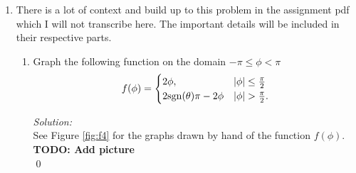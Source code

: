 \documentclass[10pt]{amsart}
\theoremstyle{nonumberplain}
\begin{document}
\begin{enumerate}[label={\bf {\arabic*}:}]
\begin{enumerate}
\end{enumerate}

\newpage

\item There is a lot of context and build up to this problem in the assignment pdf which I will not transcribe here.
The important details will be included in their respective parts. \\

\begin{enumerate}

\item Graph the following function on the domain $-\pi \leq \phi < \pi$
\begin{align*}
f(\phi) = \begin{cases}
2\phi, & |\phi| \leq \frac \pi 2 \\
2 {\rm sgn}(\theta)\pi - 2\phi & |\phi| > \frac \pi 2.
\end{cases}
\end{align*}

\textit{Solution:} \\
See Figure \ref{fig:f4} for the graphs drawn by hand of the function $f(\phi)$.
\textbf{TODO: Add picture} \\
\qed \\


\end{enumerate}
\end{enumerate}
\end{document}
